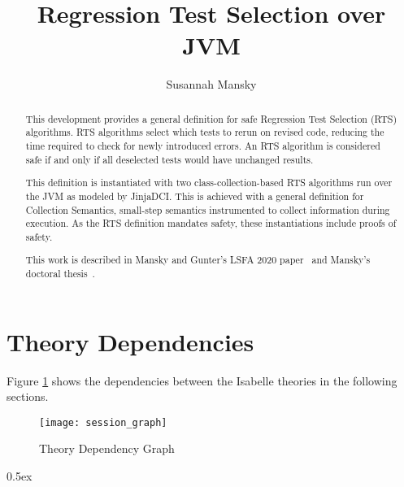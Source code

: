 \documentclass[11pt,a4paper]{article}
\begin{document}
\title{Regression Test Selection over JVM}
\author{Susannah Mansky}
\maketitle

\begin{abstract}
This development provides a general definition for safe Regression Test Selection (RTS) algorithms. RTS algorithms select which tests to rerun on revised code, reducing the time required to check for newly introduced errors. An RTS algorithm is considered safe if and only if all deselected tests would have unchanged results.

This definition is instantiated with two class-collection-based RTS algorithms run over the JVM as modeled by JinjaDCI. This is achieved with a general definition for Collection Semantics, small-step semantics instrumented to collect information during execution. As the RTS definition mandates safety, these instantiations include proofs of safety.

This work is described in Mansky and Gunter's LSFA 2020 paper~\cite{MANSKY202051} and Mansky's doctoral thesis~\cite{mansky2020verified}.
\end{abstract}

\tableofcontents

\clearpage
\section{Theory Dependencies}

Figure \ref{theory-deps} shows the dependencies between 
the Isabelle theories in the following sections.

\begin{figure}[h!t]
\begin{center}
  \texttt{[image: session\_graph]}
\end{center}
\caption{Theory Dependency Graph\label{theory-deps}}
\end{figure}

\parindent 0pt\parskip 0.5ex

\clearpage



%

\end{document}
